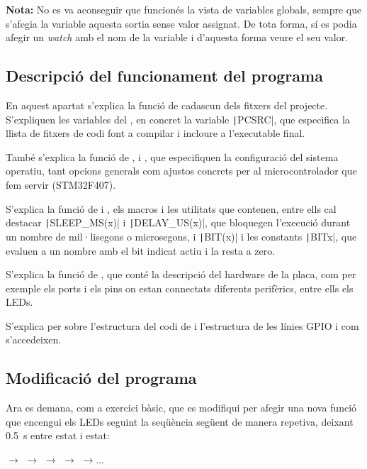 \textbf{Nota:} No es va aconseguir que funcionés la vista de variables globals, sempre que
s'afegia la variable aquesta sortia sense valor assignat. De tota forma, sí es podia afegir
un \emph{watch} amb el nom de la variable i d'aquesta forma veure el seu valor.


\subsection{Descripció del funcionament del programa}

En aquest apartat s'explica la funció de cadascun dels fitxers del projecte. S'expliquen les variables
del , en concret la variable \texttt|PCSRC|, que especifica la llista
de fitxers de codi font a compilar i incloure a l'executable final.

També s'explica la funció de ,  i ,
que especifiquen la configuració del sistema operatiu, tant opcions generals com ajustos concrets
per al microcontrolador que fem servir (STM32F407).

S'explica la funció de  i , els macros i les utilitats que contenen,
entre ells cal destacar \texttt|SLEEP_MS(x)| i \texttt|DELAY_US(x)|, que bloquegen
l'execució durant un nombre de mil·lisegons o microsegons, i \texttt|BIT(x)| i les constants
\texttt|BITx|, que evaluen a un nombre amb el bit indicat actiu i la resta a zero.

S'explica la funció de , que conté la descripció del hardware de la placa,
com per exemple els ports i els pins on estan connectats diferents perifèrics, entre ells els LEDs.

S'explica per sobre l'estructura del codi de  i l'estructura de les línies GPIO
i com s'accedeixen.


\subsection{Modificació del programa}

Ara es demana, com a exercici bàsic, que es modifiqui  per afegir una nova funció
 que encengui els LEDs seguint la seqüència següent de manera repetiva, deixant
\SI{0.5}{\second} entre estat i estat:

\begin{center} \Large
{} $\rightarrow$
 $\rightarrow$
 $\rightarrow$
 $\rightarrow$
 $\rightarrow \hdots$
\end{center}

